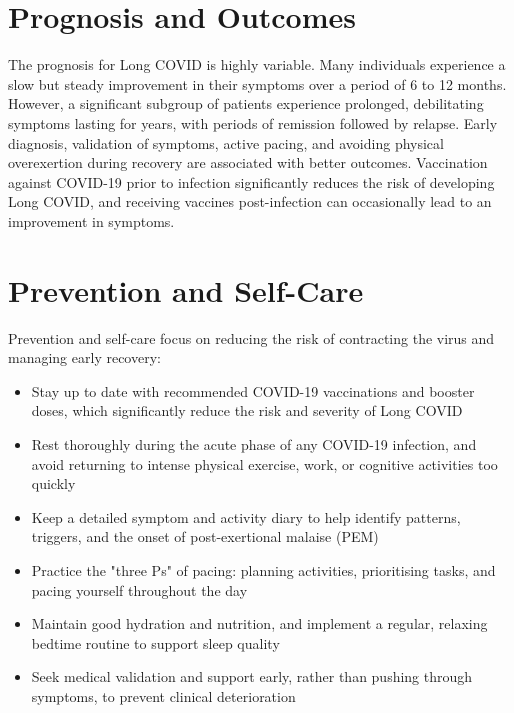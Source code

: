 \section*{Prognosis and Outcomes}
The prognosis for Long COVID is highly variable. Many individuals experience a slow but steady improvement in their symptoms over a period of 6 to 12 months. However, a significant subgroup of patients experience prolonged, debilitating symptoms lasting for years, with periods of remission followed by relapse. Early diagnosis, validation of symptoms, active pacing, and avoiding physical overexertion during recovery are associated with better outcomes. Vaccination against COVID-19 prior to infection significantly reduces the risk of developing Long COVID, and receiving vaccines post-infection can occasionally lead to an improvement in symptoms.

\section*{Prevention and Self-Care}
Prevention and self-care focus on reducing the risk of contracting the virus and managing early recovery:
\begin{itemize}
    \item Stay up to date with recommended COVID-19 vaccinations and booster doses, which significantly reduce the risk and severity of Long COVID
    \item Rest thoroughly during the acute phase of any COVID-19 infection, and avoid returning to intense physical exercise, work, or cognitive activities too quickly
    \item Keep a detailed symptom and activity diary to help identify patterns, triggers, and the onset of post-exertional malaise (PEM)
    \item Practice the "three Ps" of pacing: planning activities, prioritising tasks, and pacing yourself throughout the day
    \item Maintain good hydration and nutrition, and implement a regular, relaxing bedtime routine to support sleep quality
    \item Seek medical validation and support early, rather than pushing through symptoms, to prevent clinical deterioration
\end{itemize}

